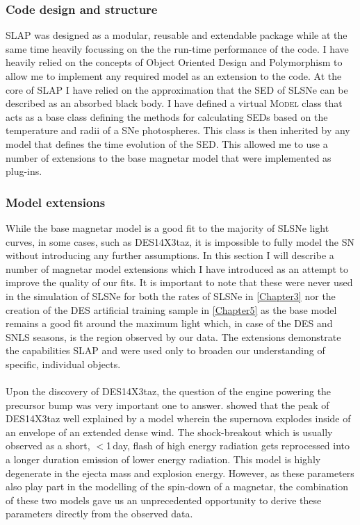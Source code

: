 \subsubsection{Code design and structure}
SLAP was designed as a modular, reusable and extendable package while at the same time heavily focussing on the the run-time performance of the code. I have heavily relied on the concepts of Object Oriented Design and Polymorphism to allow me to implement any required model as an extension to the code. At the core of \textsc{SLAP} I have relied on the approximation that the SED of SLSNe can be described as an absorbed black body. I have defined a virtual \textsc{Model} class that acts as a base class defining the methods for calculating SEDs based on the temperature and radii of a SNe photospheres. This class is then inherited by any model that defines the time evolution of the SED. This allowed me to use a number of extensions to the base magnetar model that were implemented as plug-ins.

\subsubsection{Model extensions}
While the base magnetar model is a good fit to the majority of SLSNe light curves, in some cases, such as DES14X3taz, it is impossible to fully model the SN without introducing any further assumptions. In this section I will describe a number of magnetar model extensions which I have introduced as an attempt to improve the quality of our fits. It is important to note that these were never used in the simulation of SLSNe for both the rates of SLSNe in \cref{Chapter3} nor the creation of the DES artificial training sample in \cref{Chapter5} as the base model remains a good fit around the maximum light which, in case of the DES and SNLS seasons, is the region observed by our data. The extensions demonstrate the capabilities \textsc{SLAP} and were used only to broaden our understanding of specific, individual objects.

\paragraph{\citet{Piro2015}}
Upon the discovery of DES14X3taz, the question of the engine powering the precursor bump was very important one to answer. \citet{Smith2016} showed that the peak of DES14X3taz well explained by a model wherein the supernova explodes inside of an envelope of an extended dense wind. The shock-breakout which is usually observed as a short, $<$1\,day, flash of high energy radiation gets reprocessed into a longer duration emission of lower energy radiation. This model is highly degenerate in the ejecta mass and explosion energy. However, as these parameters also play part in the modelling of the spin-down of a magnetar, the combination of these two models gave us an unprecedented opportunity to derive these parameters directly from the observed data.

